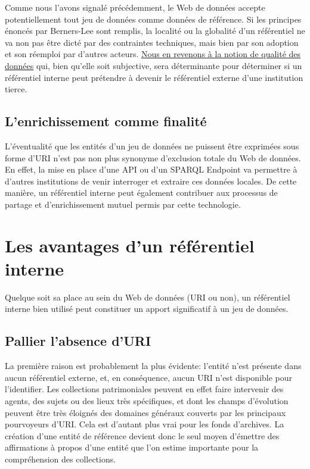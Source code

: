 \documentclass[a4paper,12pt,twoside]{book}
\begin{document}
Comme nous l'avons signalé précédemment, le Web de données accepte potentiellement tout jeu de données comme données de référence. Si les principes énoncés par Berners-Lee sont remplis, la localité ou la globalité d'un référentiel ne va non pas être dicté par des contraintes techniques, mais bien par son adoption et son réemploi par d'autres acteurs. \hyperref[transfo-referentiel]{Nous en revenons à la notion de \og qualité \fg{} des données} qui, bien qu'elle soit subjective, sera déterminante pour déterminer si un référentiel interne peut prétendre à devenir le référentiel externe d'une institution tierce. \\


\subsection{L'enrichissement comme finalité}

L'éventualité que les entités d'un jeu de données ne puissent être exprimées sous forme d'URI n'est pas non plus synonyme d'exclusion totale du Web de données. En effet, la mise en place d'une API ou d'un SPARQL Endpoint va permettre à d'autres institutions de venir interroger et extraire ces données locales. De cette manière, un référentiel interne peut également contribuer aux processus de partage et d'enrichissement mutuel permis par cette technologie. 

 
\section{Les avantages d'un référentiel interne}\label{2-referentiel-int}
Quelque soit sa place au sein du Web de données (URI ou non), un référentiel interne bien utilisé peut constituer un apport significatif à un jeu de données. 

\subsection{Pallier l'absence d'URI}
La première raison est probablement la plus évidente: l'entité n'est présente dans aucun référentiel externe, et, en conséquence, aucun URI n'est disponible pour l'identifier. Les collections patrimoniales peuvent en effet faire intervenir des agents, des sujets ou des lieux très spécifiques, et dont les champs d'évolution peuvent être très éloignés des domaines généraux couverts par les principaux pourvoyeurs d'URI. Cela est d'autant plus vrai pour les fonds d'archives. La création d'une entité de référence devient donc le seul moyen d'émettre des affirmations à propos d'une entité que l'on estime importante pour la compréhension des collections.\\
\end{document}
